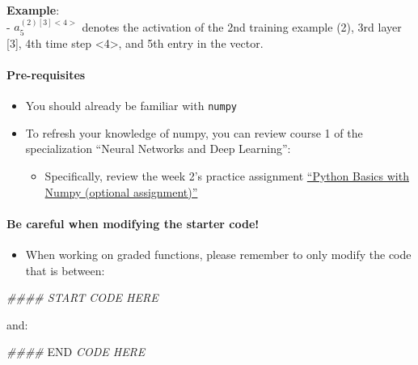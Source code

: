 \documentclass[11pt]{article}
\providecommand{\tightlist}{%
      \setlength{\itemsep}{0pt}\setlength{\parskip}{0pt}}
\newenvironment{Shaded}{}{}
\newcommand{\CommentTok}[1]{\textcolor[rgb]{0.38,0.63,0.69}{\textit{{#1}}}}
\newcommand{\RegionMarkerTok}[1]{{#1}}
\begin{document}
\textbf{Example}:\\
- \(a^{(2)[3]<4>}_5\) denotes the activation of the 2nd training example
(2), 3rd layer {[}3{]}, 4th time step \textless4\textgreater, and 5th
entry in the vector.

\hypertarget{pre-requisites}{%
\paragraph{Pre-requisites}\label{pre-requisites}}

\begin{itemize}
\tightlist
\item
  You should already be familiar with \texttt{numpy}
\item
  To refresh your knowledge of numpy, you can review course 1 of the
  specialization ``Neural Networks and Deep Learning'':

  \begin{itemize}
  \tightlist
  \item
    Specifically, review the week 2's practice assignment
    \href{https://www.coursera.org/learn/neural-networks-deep-learning/programming/isoAV/python-basics-with-numpy}{``Python
    Basics with Numpy (optional assignment)''}
  \end{itemize}
\end{itemize}

\hypertarget{be-careful-when-modifying-the-starter-code}{%
\paragraph{Be careful when modifying the starter
code!}\label{be-careful-when-modifying-the-starter-code}}

\begin{itemize}
\tightlist
\item
  When working on graded functions, please remember to only modify the
  code that is between:
\end{itemize}

\begin{Shaded}
\begin{Highlighting}[]
\CommentTok{\#\#\#\# START CODE HERE}
\end{Highlighting}
\end{Shaded}

and:

\begin{Shaded}
\begin{Highlighting}[]
\CommentTok{\#\#\#\# }\RegionMarkerTok{END}\CommentTok{ CODE HERE}
\end{Highlighting}
\end{Shaded}
\end{document}
